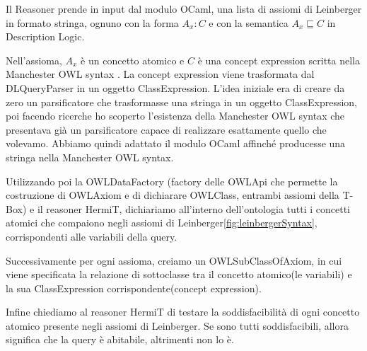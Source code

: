 Il Reasoner prende in input dal modulo OCaml, una lista di assiomi di Leinberger in formato stringa, ognuno con la forma \(A_{x} : C\) e con la semantica \( A_{x}\sqsubseteq C \) in Description Logic.

Nell'assioma, \(A_{x}\) è un concetto atomico e \(C\) è una concept expression scritta nella Manchester OWL syntax \cite{ManchesterOWLSyntax}. La concept expression viene trasformata dal DLQueryParser in un oggetto ClassExpression. L'idea iniziale era di creare da zero un parsificatore che trasformasse una stringa in un oggetto ClassExpression, poi facendo ricerche ho scoperto l'esistenza della Manchester OWL syntax che presentava già un parsificatore capace di realizzare esattamente quello che volevamo. Abbiamo quindi adattato il modulo OCaml affinché producesse una stringa nella Manchester OWL syntax.

Utilizzando poi la OWLDataFactory (factory delle OWLApi che permette la costruzione di OWLAxiom e di dichiarare OWLClass, entrambi assiomi della T-Box) e il reasoner HermiT\cite{HermiT}, dichiariamo all'interno dell'ontologia tutti i concetti atomici che compaiono negli assiomi di Leinberger\ref{fig:leinbergerSyntax}, corrispondenti alle variabili della query.

Successivamente per ogni assioma, creiamo un OWLSubClassOfAxiom, in cui viene specificata la relazione di sottoclasse tra il concetto atomico(le variabili) e la sua ClassExpression corrispondente(concept expression).

Infine chiediamo al reasoner HermiT di testare la soddisfacibilità di ogni concetto atomico presente negli assiomi di Leinberger. Se sono tutti soddisfacibili, allora significa che la query è abitabile, altrimenti non lo è.

\newpage
